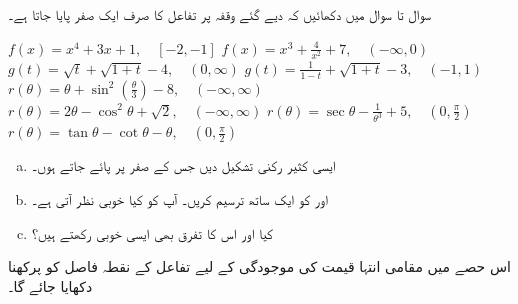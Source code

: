 سوال  تا سوال  میں دکھائیں کہ دیے گئے وقفہ پر تفاعل کا صرف ایک صفر پایا جاتا ہے۔

$f(x)=x^4+3x+1,\quad [-2,-1]$
$f(x)=x^3+\tfrac{4}{x^2}+7,\quad (-\infty,0)$
$g(t)=\sqrt{t}+\sqrt{1+t}-4,\quad (0,\infty)$
$g(t)=\tfrac{1}{1-t}+\sqrt{1+t}-3,\quad (-1,1)$
$r(\theta)=\theta+\sin^2(\tfrac{\theta}{3})-8,\quad (-\infty,\infty)$
$r(\theta)=2\theta-\cos^2\theta+\sqrt{2},\quad (-\infty,\infty)$
$r(\theta)=\sec\theta-\tfrac{1}{\theta^3}+5,\quad (0,\tfrac{\pi}{2})$
$r(\theta)=\tan\theta-\cot\theta-\theta,\quad (0,\tfrac{\pi}{2})$
\\
\begin{enumerate}[a.]
\item
ایسی  کثیر رکنی  تشکیل دیں جس کے صفر  پر پائے جاتے ہوں۔
\item
{} اور  کو ایک ساتھ ترسیم کریں۔ آپ کو کیا خوبی نظر آتی ہے۔
\item
کیا  اور اس کا تفرق   بھی ایسی خوبی رکھتے ہیں؟
\end{enumerate}


اس حصے میں مقامی انتہا قیمت کی  موجودگی کے لیے تفاعل کے نقطہ فاصل  کو پرکھنا دکھایا جائے گا۔ 

